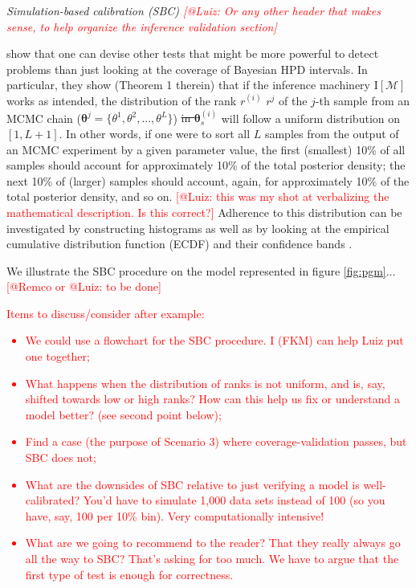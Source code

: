 \documentclass[oneside]{article}
\begin{document}
\vspace{.25cm}

\noindent \emph{Simulation-based calibration (SBC) \textcolor{red}{[@Luiz: Or any other
    header that makes sense, to help organize the inference validation section]}}

\cite{Talts2018} show that one can devise other tests that might be
more powerful to detect problems than just looking at the coverage of
Bayesian HPD intervals.
In particular, they show (Theorem 1 therein) that if the inference machinery
$\text{I}[\mathcal{M}]$ works as intended, the distribution of the rank
\st{$r^{(i)}$} $r^j$ of the $j$-th sample from an MCMC chain ($\boldsymbol{\theta}^j
= \{\theta^1, \theta^2, ..., \theta^L\}$) \st{in $\boldsymbol\theta_s^{(i)}$}
will follow a uniform distribution on $[1, L + 1]$.
In other words, if one were to sort all $L$ samples from the output
of an MCMC experiment by a given parameter value, the first (smallest)
10\% of all samples should account for approximately 10\% of the total
posterior density; the next 10\% of (larger) samples should account, again,
for approximately 10\% of the total posterior density, and so on.
\textcolor{red}{[@Luiz: this was my shot at verbalizing the mathematical
  description. Is this correct?]}
Adherence to this distribution can be investigated by constructing
histograms \citep{Talts2018} as well as by looking at the empirical
cumulative distribution function (ECDF) and their confidence bands
\citep{Sailynoja2021}.

We illustrate the SBC procedure on the model represented in figure
\ref{fig:pgm}... \textcolor{red}{[@Remco or @Luiz: to be done]}

\textcolor{red}{
  Items to discuss/consider after example:
  \begin{itemize}
  \item We could use a flowchart for the SBC procedure. I (FKM) can
    help Luiz put one together;
  \item What happens when the distribution of ranks is not uniform,
    and is, say, shifted towards low or high ranks? How can this help
    us fix or understand a model better? (see second point below);
  \item Find a case (the purpose of Scenario 3) where
    coverage-validation passes, but SBC does not;
  \item What are the downsides of SBC relative to just verifying
    a model is well-calibrated? You'd have to simulate 1,000
    data sets instead of 100 (so you have, say, 100 per 10\% bin).
    Very computationally intensive!
  \item What are we going to recommend to the reader? That they
    really always go all the way to SBC? That's asking for too much.
    We have to argue that the first type of test is enough for
    correctness.
  \end{itemize}
}
\end{document}

